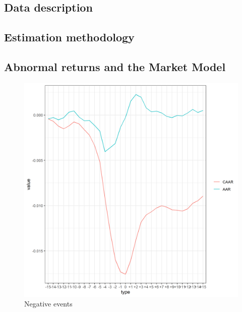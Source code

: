 
\subsection{Data description}


\subsection{Estimation methodology}


\subsection{Abnormal returns and the Market Model}






\begin{figure}[!tbp]
  \centering
  \begin{minipage}[b]{0.45\textwidth}
    \includegraphics[scale=0.5]{Projekt/1.Figures analysis/ST_negative_all.png}
    \caption{Negative events}
  \end{minipage}
  \hfill
  \begin{minipage}[b]{0.45\textwidth}

\end{minipage}
\end{figure}
